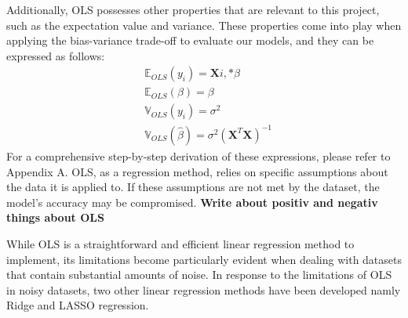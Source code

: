 \noindent Additionally, OLS possesses other properties that are relevant to this project,
such as the expectation value and variance. These properties come into play 
when applying the bias-variance trade-off to evaluate our models, and they can 
be expressed as follows:
\begin{align}
&\mathbb{E}_{OLS}(y_i) = \textbf{X}{i,*} \beta\\
&\mathbb{E}_{OLS}(\beta) = \beta\\
&\mathbb{V}_{OLS}(y_i) = \sigma^2\\
&\mathbb{V}_{OLS}(\hat{\beta}) = \sigma^2 (\textbf{X}^T \textbf{X})^{-1}
\end{align}
\noindent For a comprehensive step-by-step derivation of these expressions, please refer
to Appendix A. OLS, as a regression method, relies on specific assumptions 
about the data it is applied to. If these assumptions are not met by the 
dataset, the model's accuracy may be compromised. 
\newline \newline
\textbf{Write about positiv and negativ things about OLS}
\newline \newline

\noindent While OLS is a straightforward and efficient linear regression method 
to implement, its limitations become particularly evident when dealing 
with datasets that contain substantial amounts of noise. In response to the 
limitations of OLS in noisy datasets, two other linear regression methods have been
developed namly Ridge and LASSO regression. 


